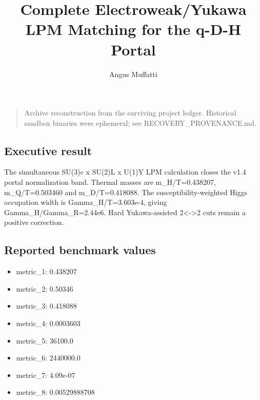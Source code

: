\documentclass[
]{article}
\title{Complete Electroweak/Yukawa LPM Matching for the q-D-H Portal}
\author{Angus Muffatti}
\date{}
\providecommand{\tightlist}{%
  \setlength{\itemsep}{0pt}\setlength{\parskip}{0pt}}
\begin{document}
\maketitle

\begin{quote}
Archive reconstruction from the surviving project ledger. Historical
sandbox binaries were ephemeral; see RECOVERY\_PROVENANCE.md.
\end{quote}

\hypertarget{executive-result}{%
\subsection{Executive result}\label{executive-result}}

The simultaneous SU(3)c x SU(2)L x U(1)Y LPM calculation closes the v1.4
portal normalization band. Thermal masses are m\_H/T=0.438207,
m\_Q/T=0.503460 and m\_D/T=0.418088. The susceptibility-weighted Higgs
occupation width is Gamma\_H/T=3.603e-4, giving
Gamma\_H/Gamma\_R=2.44e6. Hard Yukawa-assisted 2\textless-\textgreater2
cuts remain a positive correction.

\hypertarget{reported-benchmark-values}{%
\subsection{Reported benchmark values}\label{reported-benchmark-values}}

\begin{itemize}
\tightlist
\item
  metric\_1: 0.438207
\item
  metric\_2: 0.50346
\item
  metric\_3: 0.418088
\item
  metric\_4: 0.0003603
\item
  metric\_5: 36100.0
\item
  metric\_6: 2440000.0
\item
  metric\_7: 4.09e-07
\item
  metric\_8: 0.00529888708
\end{itemize}
\end{document}
